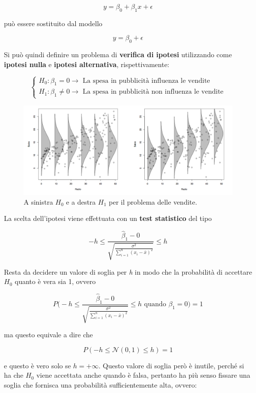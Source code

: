$$
y = \beta_0 + \beta_1 x + \epsilon
$$

può essere sostituito dal modello

$$
y = \beta_0 + \epsilon
$$

Si può quindi definire un problema di \textbf{verifica di ipotesi} utilizzando come \textbf{ipotesi nulla} e \textbf{ipotesi alternativa}, rispettivamente:

$$
\begin{cases}
H_0 : \beta_1 = 0 \rightarrow \text{ La spesa in pubblicità influenza le vendite} \\
H_1 : \beta_1 \neq 0  \rightarrow \text{ La spesa in pubblicità non influenza le vendite} 
\end{cases}
$$

\begin{figure}[htbp]
	\centering
	\includegraphics[width = .9\textwidth]{./notes/immagini/l5-fig2-1.png}
	\caption{A sinistra $ H_0 $ e a destra $ H_1 $ per il problema delle vendite.}
\end{figure}


La scelta dell'ipotesi viene effettuata con un \textbf{test statistico} del tipo

$$
-h \leq \frac{\hat{\beta}_1 - 0 }{\sqrt{\frac{\sigma^2}{\sum_{i=1}^n (x_i - \bar{x})^2}}} \leq h
$$

Resta da decidere un valore di soglia per \textit{h} in modo che la probabilità di accettare $ H_0 $ quanto è vera sia 1, ovvero

$$
P\Bigg(-h \leq \frac{\hat{\beta}_1 - 0 }{\sqrt{\frac{\sigma^2}{\sum_{i=1}^n (x_i - \bar{x})^2}}} \leq h \text{ quando }\beta_1 = 0 \Bigg) = 1
$$

ma questo equivale a dire che  

$$
P(-h \leq \mathcal{N}(0,1) \leq h) = 1
$$

e questo è vero solo se $ h = + \infty $.
Questo valore di soglia però è inutile, perché si ha che $ H_0 $ viene accettata anche quando è falsa, pertanto ha più senso fissare una soglia che fornisca una probabilità sufficientemente alta, ovvero:


